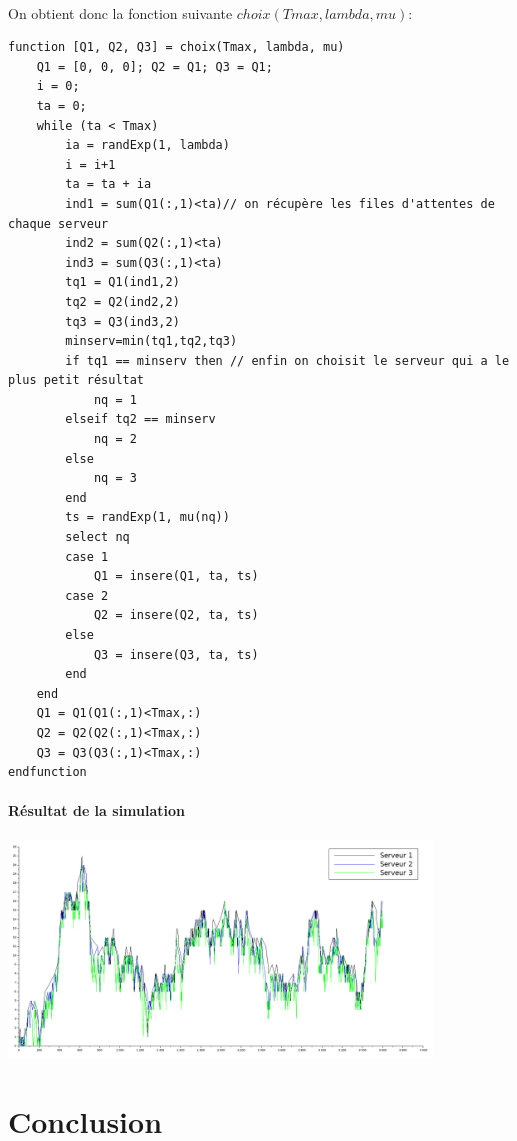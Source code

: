 \documentclass{article}
\begin{document}
\paragraph{}On obtient donc la fonction suivante $choix(Tmax,lambda,mu)$:
\begin{verbatim}
function [Q1, Q2, Q3] = choix(Tmax, lambda, mu)
    Q1 = [0, 0, 0]; Q2 = Q1; Q3 = Q1;
    i = 0;
    ta = 0; 
    while (ta < Tmax)
        ia = randExp(1, lambda)
        i = i+1 
        ta = ta + ia 
        ind1 = sum(Q1(:,1)<ta)// on récupère les files d'attentes de chaque serveur
        ind2 = sum(Q2(:,1)<ta)
        ind3 = sum(Q3(:,1)<ta)
        tq1 = Q1(ind1,2)
        tq2 = Q2(ind2,2)
        tq3 = Q3(ind3,2)
        minserv=min(tq1,tq2,tq3)
        if tq1 == minserv then // enfin on choisit le serveur qui a le plus petit résultat
            nq = 1
        elseif tq2 == minserv
            nq = 2
        else
            nq = 3
        end
        ts = randExp(1, mu(nq))
        select nq 
        case 1 
            Q1 = insere(Q1, ta, ts)
        case 2 
            Q2 = insere(Q2, ta, ts)
        else
            Q3 = insere(Q3, ta, ts)
        end
    end
    Q1 = Q1(Q1(:,1)<Tmax,:)
    Q2 = Q2(Q2(:,1)<Tmax,:)
    Q3 = Q3(Q3(:,1)<Tmax,:)
endfunction
\end{verbatim}

\paragraph{Résultat de la simulation}
\begin{center}
	\includegraphics[width=425px]{img/choix.png}
\end{center}

\section{Conclusion}
\paragraph{}

\newpage
\appendix

%
%
\end{document}
